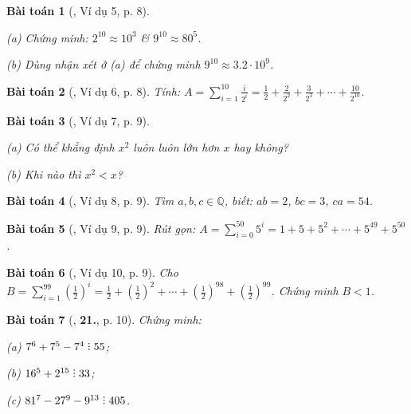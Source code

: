 \documentclass{article}
\numberwithin{equation}{section}
\newtheorem{baitoan}{Bài toán}[section]
\DeclareRobustCommand{\divby}{%
	\mathrel{\vbox{\baselineskip.65ex\lineskiplimit0pt\hbox{.}\hbox{.}\hbox{.}}}%
}
\begin{document}
\begin{baitoan}[\cite{Binh_Toan_7_tap_1}, Ví dụ 5, p. 8]
	\begin{enumerate*}
		\item[(a)] Chứng minh: $2^{10}\approx 10^3$ \& $9^{10}\approx 80^5$.
		\item[(b)] Dùng nhận xét ở (a) để chứng minh $9^{10}\approx 3.2\cdot 10^9$.
	\end{enumerate*}
\end{baitoan}

\begin{baitoan}[\cite{Binh_Toan_7_tap_1}, Ví dụ 6, p. 8]
	Tính: $A = \sum_{i=1}^{10} \frac{i}{2^i} = \frac{1}{2} + \frac{2}{2^2} + \frac{3}{2^3} + \cdots + \frac{10}{2^{10}}$.
\end{baitoan}

\begin{baitoan}[\cite{Binh_Toan_7_tap_1}, Ví dụ 7, p. 9]
	\begin{enumerate*}
		\item[(a)] Có thể khẳng định $x^2$ luôn luôn lớn hơn $x$ hay không?
		\item[(b)] Khi nào thì $x^2 < x$?
	\end{enumerate*}
\end{baitoan}

\begin{baitoan}[\cite{Binh_Toan_7_tap_1}, Ví dụ 8, p. 9]
	Tìm $a,b,c\in\mathbb{Q}$, biết: $ab = 2$, $bc = 3$, $ca = 54$.
\end{baitoan}

\begin{baitoan}[\cite{Binh_Toan_7_tap_1}, Ví dụ 9, p. 9]
	Rút gọn: $A = \sum_{i=0}^{50} 5^i = 1 + 5 + 5^2 + \cdots + 5^{49} + 5^{50}$.
\end{baitoan}

\begin{baitoan}[\cite{Binh_Toan_7_tap_1}, Ví dụ 10, p. 9]
	Cho $B = \sum_{i=1}^{99} \left(\frac{1}{2}\right)^i = \frac{1}{2} + \left(\frac{1}{2}\right)^2 + \cdots + \left(\frac{1}{2}\right)^{98} + \left(\frac{1}{2}\right)^{99}$. Chứng minh $B < 1$.
\end{baitoan}

\begin{baitoan}[\cite{Binh_Toan_7_tap_1}, \textbf{21.}, p. 10]
	Chứng minh:
	\begin{enumerate*}
		\item[(a)] $7^6 + 7^5 - 7^4\divby 55$;
		\item[(b)] $16^5 + 2^{15}\divby 33$;
		\item[(c)] $81^7 - 27^9 - 9^{13}\divby 405$.
	\end{enumerate*}
\end{baitoan}
\end{document}
